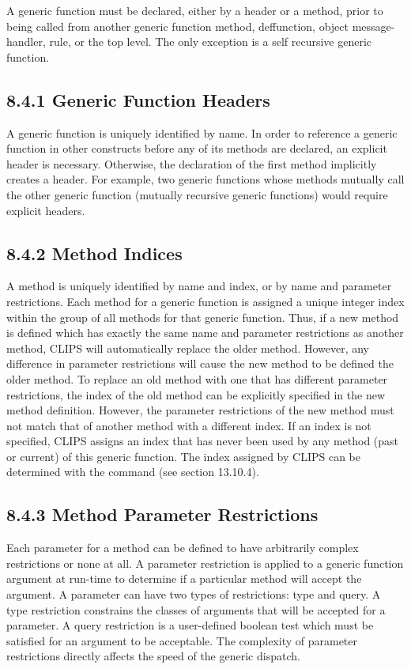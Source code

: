 \documentclass[letterpaper,10pt,english]{sphinxmanual}
\begin{document}
A generic function must be declared, either by a header or a method,
prior to being called from another generic function method, deffunction,
object message-handler, rule, or the top level. The only exception is a
self recursive generic function.


\subsection{8.4.1 Generic Function Headers}
\label{\detokenize{generic:generic-function-headers}}
A generic function is uniquely identified by name. In order to reference
a generic function in other constructs before any of its methods are
declared, an explicit header is necessary. Otherwise, the declaration of
the first method implicitly creates a header. For example, two generic
functions whose methods mutually call the other generic function
(mutually recursive generic functions) would require explicit headers.


\subsection{8.4.2 Method Indices}
\label{\detokenize{generic:method-indices}}
A method is uniquely identified by name and index, or by name and
parameter restrictions. Each method for a generic function is assigned a
unique integer index within the group of all methods for that generic
function. Thus, if a new method is defined which has exactly the same
name and parameter restrictions as another method, CLIPS will
automatically replace the older method. However, any difference in
parameter restrictions will cause the new method to be defined  the older method. To replace an old method with one that
has different parameter restrictions, the index of the old method can be
explicitly specified in the new method definition. However, the
parameter restrictions of the new method must not match that of another
method with a different index. If an index is not specified, CLIPS
assigns an index that has never been used by any method (past or
current) of this generic function. The index assigned by CLIPS can be
determined with the  command (see section 13.10.4).


\subsection{8.4.3 Method Parameter Restrictions}
\label{\detokenize{generic:method-parameter-restrictions}}
Each parameter for a method can be defined to have arbitrarily complex
restrictions or none at all. A parameter restriction is applied to a
generic function argument at run-time to determine if a particular
method will accept the argument. A parameter can have two types of
restrictions: type and query. A type restriction constrains the classes
of arguments that will be accepted for a parameter. A query restriction
is a user-defined boolean test which must be satisfied for an argument
to be acceptable. The complexity of parameter restrictions directly
affects the speed of the generic dispatch.
\end{document}
